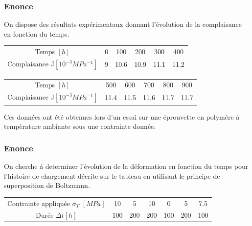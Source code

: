 \documentclass[first,firstsupp,lastsupp,handout,last,hyperref,table]{ETHclass}
\begin{document}
\begin{frame}
\frametitle{Enonce}
\centering
On dispose des r\'esultats exp\'erimentaux donnant l'\'evolution de la complaisance en fonction du temps.
\begin{table}
\begin{tabular}{cccccc}
{\footnotesize Temps $\left[h\right]$}                      &{\footnotesize 0}&{\footnotesize 100} &{\footnotesize 200} &{\footnotesize 300}&{\footnotesize 400}\\
{\footnotesize Complaisance J$\left[10^{-3}MPa^{-1}\right]$}&{\footnotesize 9}&{\footnotesize 10.6}&{\footnotesize 10.9}&{\footnotesize 11.1}&{\footnotesize 11.2}\\
\end{tabular}
\end{table}
\begin{table}
\begin{tabular}{cccccc}
{\footnotesize Temps $\left[h\right]$}                      &{\footnotesize 500}&{\footnotesize 600}&{\footnotesize 700}&{\footnotesize 800}&{\footnotesize 900}\\
{\footnotesize Complaisance J$\left[10^{-3}MPa^{-1}\right]$}&{\footnotesize 11.4}&{\footnotesize 11.5}&{\footnotesize 11.6}&{\footnotesize 11.7}&{\footnotesize 11.7}\\
\end{tabular}
\end{table}
Ces donn\'ees ont \'et\'e obtenues lors d'un essai sur une \'eprouvette en polym\'ere \'a temp\`erature ambiante sous une contrainte donn\'ee.
\end{frame}

\begin{frame}
\frametitle{Enonce}
\centering
On cherche \'a determiner l'\'evolution de la d\'eformation en fonction du temps pour l'histoire de chargement d\'ecrite sur le tableau en utilisant le principe de superposition de Boltzmann.
\begin{tabular}{ccccccc}
{\footnotesize Contrainte appliqu\'ee $\sigma_{T}$ $\left[MPa\right]$}&{\footnotesize 10}&{\footnotesize 5} &{\footnotesize 10} &{\footnotesize 0}&{\footnotesize 5}&{\footnotesize 7.5}\\
{\footnotesize Dur\'ee $\Delta t\left[h\right]$}                     &{\footnotesize 100}&{\footnotesize 200}&{\footnotesize 200}&{\footnotesize 100}&{\footnotesize 200}&{\footnotesize 100}\\
\end{tabular}
\end{frame}

\begin{frame}[plain]
\frametitle{}
\end{frame}
\end{document}
